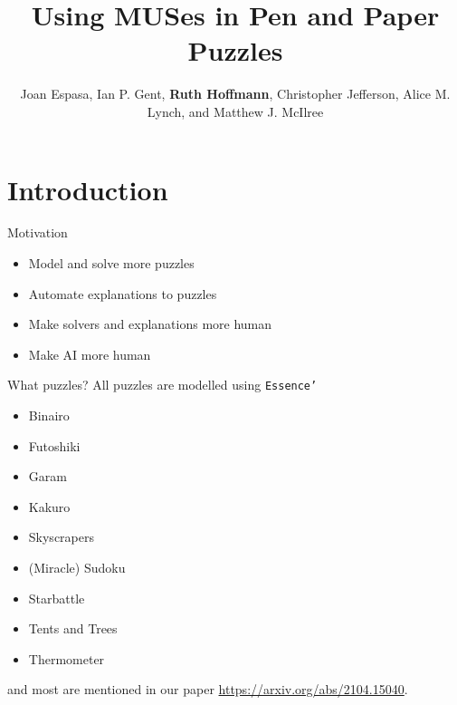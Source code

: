 \documentclass{beamer}
\title[MUSes in Puzzles]{Using MUSes in Pen and Paper Puzzles}
\author[R Hoffmann]{Joan Espasa, Ian P. Gent, {\textbf{Ruth Hoffmann}}, Christopher Jefferson, Alice M. Lynch, and Matthew J. McIlree}
\institute[FATA]{FATA, Glasgow}
\begin{document}
{
    \begin{frame}
        \titlepage
    \end{frame}
}

\section*{Introduction}
\begin{frame}{Motivation}
\begin{itemize}
\item Model and solve more puzzles
\item Automate explanations to puzzles
\item Make solvers and explanations more human
\item Make AI more human
\end{itemize}

\end{frame}

\begin{frame}{What puzzles?}
All puzzles are modelled using {\texttt{Essence'}} 
\begin{itemize}
\item Binairo
\item Futoshiki
\item Garam
\item Kakuro
\item Skyscrapers
\item (Miracle) Sudoku
\item Starbattle
\item Tents and Trees
\item Thermometer
\end{itemize}
and most are mentioned in our paper {\footnotesize{\url{https://arxiv.org/abs/2104.15040}}}.
\end{frame}

\end{document}
